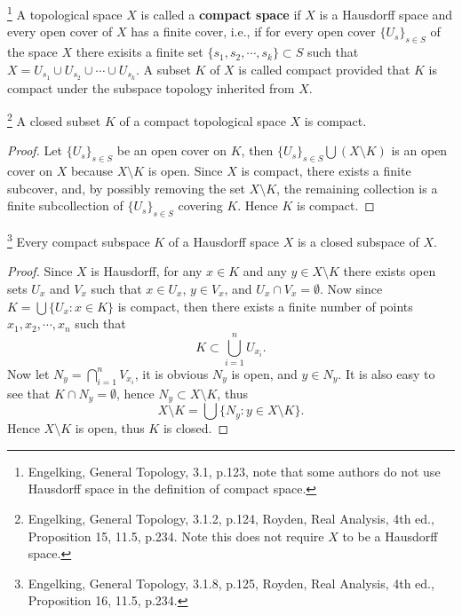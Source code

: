 \begin{definition}
\footnote{Engelking, General Topology, 3.1, p.123, note that some authors do not
use Hausdorff space in the definition of compact space.}
A topological space $X$ is called a \textbf{compact space} 
if $X$ is a Hausdorff
space and every open cover of $X$ has a finite cover, i.e., if for every open
cover $\{U_s\}_{s\in S}$ of the space $X$ there exisits a finite set 
$\{s_1,s_2,\cdots,s_k\}\subset S$ such that
$X=U_{s_1}\cup U_{s_2}\cup \cdots \cup U_{s_k}$.
A subset $K$ of $X$ is called compact provided that $K$ is compact under the
subspace topology inherited from $X$.
\end{definition}

\begin{proposition} \label{P:compact1}
\footnote{Engelking, General Topology, 3.1.2, p.124, Royden, Real Analysis, 4th
    ed., Proposition 15, 11.5, p.234. Note this does not require $X$ to be a
    Hausdorff space.}
A closed subset $K$ of a compact topological space $X$ is compact.
\end{proposition}
\begin{proof}
Let $\{U_s\}_{s\in S}$ be an open cover on $K$, then 
$\{U_s\}_{s\in S} \bigcup (X\setminus K)$ is an open cover on $X$ because
$X\setminus K$ is open. Since $X$ is compact, there exists a finite subcover,
and, by possibly removing the set $X\setminus K$, the remaining collection is a
finite subcollection of $\{U_s\}_{s\in S}$ covering $K$. Hence $K$ is compact.
\end{proof}

\begin{proposition} \label{P:compact2}
\footnote{Engelking, General Topology, 3.1.8, p.125, Royden, Real Analysis, 4th
    ed., Proposition 16, 11.5, p.234.}
Every compact subspace $K$ of a Hausdorff space $X$ is a closed subspace of $X$.
\end{proposition}
\begin{proof}
Since $X$ is Hausdorff, for any $x\in K$ and any $y\in X\setminus K$ there
exists open sets $U_x$ and $V_x$ such that $x\in U_x$, $y\in V_x$, and 
$U_x\cap V_x=\emptyset$. Now since $K=\bigcup \{U_x: x\in K\}$ is compact, then
there exists a finite number of points $x_1,x_2,\cdots,x_n$ such that
\[
  K\subset \bigcup_{i=1}^n U_{x_i}.
\]
Now let $N_y=\bigcap_{i=1}^n V_{x_i}$, it is obvious $N_y$ is open, and 
$y\in N_y$. It is also easy to see that $K\cap N_y=\emptyset$, hence 
$N_y\subset X\setminus K$, thus 
\[
  X\setminus K=\bigcup\{N_y:y\in X\setminus K\}.
\]
Hence $X\setminus K$ is open, thus $K$ is closed.
\end{proof}

